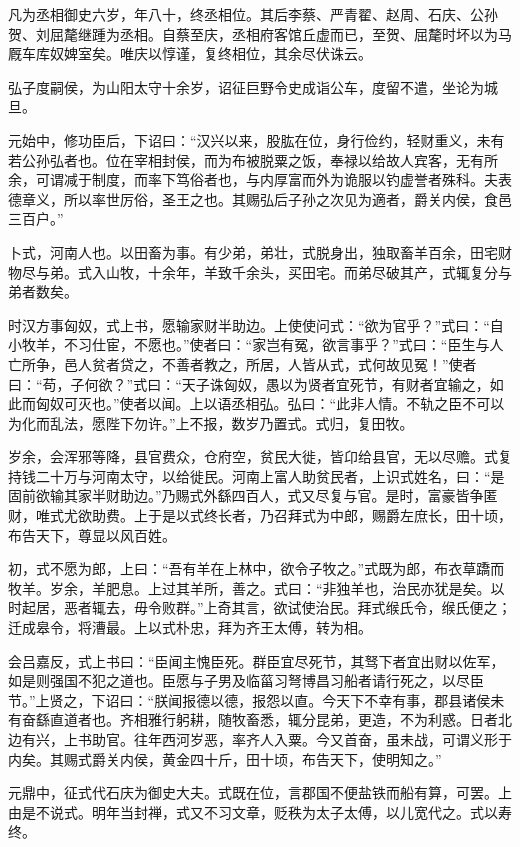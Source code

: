 \documentclass[]{article}
\begin{document}
凡为丞相御史六岁，年八十，终丞相位。其后李蔡、严青翟、赵周、石庆、公孙贺、刘屈氂继踵为丞相。自蔡至庆，丞相府客馆丘虚而已，至贺、屈氂时坏以为马厩车库奴婢室矣。唯庆以惇谨，复终相位，其余尽伏诛云。

弘子度嗣侯，为山阳太守十余岁，诏征巨野令史成诣公车，度留不遣，坐论为城旦。

元始中，修功臣后，下诏曰：``汉兴以来，股肱在位，身行俭约，轻财重义，未有若公孙弘者也。位在宰相封侯，而为布被脱粟之饭，奉禄以给故人宾客，无有所余，可谓减于制度，而率下笃俗者也，与内厚富而外为诡服以钓虚誉者殊科。夫表德章义，所以率世厉俗，圣王之也。其赐弘后子孙之次见为適者，爵关内侯，食邑三百户。''

卜式，河南人也。以田畜为事。有少弟，弟壮，式脱身出，独取畜羊百余，田宅财物尽与弟。式入山牧，十余年，羊致千余头，买田宅。而弟尽破其产，式辄复分与弟者数矣。

时汉方事匈奴，式上书，愿输家财半助边。上使使问式：``欲为官乎？''式曰：``自小牧羊，不习仕宦，不愿也。''使者曰：``家岂有冤，欲言事乎？''式曰：``臣生与人亡所争，邑人贫者贷之，不善者教之，所居，人皆从式，式何故见冤！''使者曰：``苟，子何欲？''式曰：``天子诛匈奴，愚以为贤者宜死节，有财者宜输之，如此而匈奴可灭也。''使者以闻。上以语丞相弘。弘曰：``此非人情。不轨之臣不可以为化而乱法，愿陛下勿许。''上不报，数岁乃置式。式归，复田牧。

岁余，会浑邪等降，县官费众，仓府空，贫民大徙，皆卬给县官，无以尽赡。式复持钱二十万与河南太守，以给徙民。河南上富人助贫民者，上识式姓名，曰：``是固前欲输其家半财助边。''乃赐式外繇四百人，式又尽复与官。是时，富豪皆争匿财，唯式尤欲助费。上于是以式终长者，乃召拜式为中郎，赐爵左庶长，田十顷，布告天下，尊显以风百姓。

初，式不愿为郎，上曰：``吾有羊在上林中，欲令子牧之。''式既为郎，布衣草蹻而牧羊。岁余，羊肥息。上过其羊所，善之。式曰：``非独羊也，治民亦犹是矣。以时起居，恶者辄去，毋令败群。''上奇其言，欲试使治民。拜式缑氏令，缑氏便之；迁成皋令，将漕最。上以式朴忠，拜为齐王太傅，转为相。

会吕嘉反，式上书曰：``臣闻主愧臣死。群臣宜尽死节，其驽下者宜出财以佐军，如是则强国不犯之道也。臣愿与子男及临菑习弩博昌习船者请行死之，以尽臣节。''上贤之，下诏曰：``朕闻报德以德，报怨以直。今天下不幸有事，郡县诸侯未有奋繇直道者也。齐相雅行躬耕，随牧畜悉，辄分昆弟，更造，不为利惑。日者北边有兴，上书助官。往年西河岁恶，率齐人入粟。今又首奋，虽未战，可谓义形于内矣。其赐式爵关内侯，黄金四十斤，田十顷，布告天下，使明知之。''

元鼎中，征式代石庆为御史大夫。式既在位，言郡国不便盐铁而船有算，可罢。上由是不说式。明年当封禅，式又不习文章，贬秩为太子太傅，以儿宽代之。式以寿终。
\end{document}
